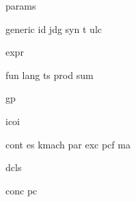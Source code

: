 {params}

{generic}
{id}
{jdg}
{syn}
{t}
{ulc}

{expr}

{fun}
{lang}
{ts}
{prod}
{sum}

{gp}

{icoi}

{cont}
{es}
{kmach}
{par}
{exc}
{pcf}
{ma}

{dcls}

{conc}
{pc}
